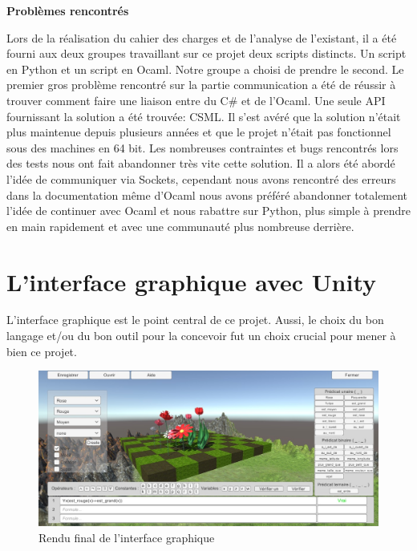 \begin{center}\textbf{Problèmes rencontrés}\end{center}
Lors de la réalisation du cahier des charges et de l'analyse de l'existant, il a été fourni aux deux groupes travaillant sur ce projet deux scripts distincts. Un script en Python et un script en Ocaml.
Notre groupe a choisi de prendre le second. Le premier gros problème rencontré sur la partie communication a été de réussir à trouver comment faire une liaison entre du C\# et de l'Ocaml.
Une seule API fournissant la solution a été trouvée: CSML. Il s'est avéré que la solution n'était plus maintenue depuis plusieurs années et que le projet n'était pas fonctionnel sous des machines en 64 bit. Les nombreuses contraintes et bugs rencontrés lors des tests nous ont fait abandonner très vite cette solution.
Il a alors été abordé l'idée de communiquer via Sockets, cependant nous avons rencontré des erreurs dans la documentation même d'Ocaml nous avons préféré abandonner totalement l'idée de continuer avec Ocaml et nous rabattre sur Python, plus simple à prendre en main rapidement et avec une communauté plus nombreuse derrière.

\newpage{}


\section{L'interface graphique avec Unity}

L'interface graphique est le point central de ce projet. Aussi, le choix du bon langage et/ou du bon outil pour la concevoir fut un choix crucial pour mener à bien ce projet.

\begin{center}
\begin{figure}[!h]
\includegraphics[scale=0.5]{choix_techniques/rendu_final.jpg}
\caption{Rendu final de l'interface graphique}
\end{figure}
\end{center}
\clearpage

